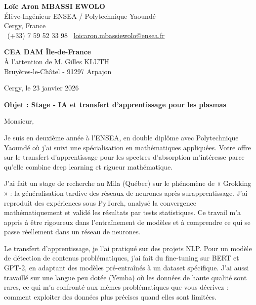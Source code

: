 \documentclass[a4paper,11pt]{article}
\begin{document}
\noindent
\textbf{Loïc Aron MBASSI EWOLO} \\
Élève-Ingénieur ENSEA / Polytechnique Yaoundé \\
Cergy, France \\
\faPhone\ (+33) 7 59 52 33 98 \quad \faEnvelope\ \href{mailto:loicaron.mbassiewolo@ensea.fr}{loicaron.mbassiewolo@ensea.fr}

\vspace{0.6cm}

\noindent
\textbf{CEA DAM Île-de-France} \\
À l'attention de M. Gilles KLUTH \\
Bruyères-le-Châtel - 91297 Arpajon

\hfill Cergy, le 23 janvier 2026

\vspace{0.5cm}

\noindent\textbf{Objet : Stage - IA et transfert d'apprentissage pour les plasmas}

\vspace{0.4cm}

Monsieur,

\vspace{0.3cm}

Je suis en deuxième année à l'ENSEA, en double diplôme avec Polytechnique Yaoundé où j'ai suivi une spécialisation en mathématiques appliquées. Votre offre sur le transfert d'apprentissage pour les spectres d'absorption m'intéresse parce qu'elle combine deep learning et rigueur mathématique.

\vspace{0.25cm}

J'ai fait un stage de recherche au Mila (Québec) sur le phénomène de « Grokking » : la généralisation tardive des réseaux de neurones après surapprentissage. J'ai reproduit des expériences sous PyTorch, analysé la convergence mathématiquement et validé les résultats par tests statistiques. Ce travail m'a appris à être rigoureux dans l'entraînement de modèles et à comprendre ce qui se passe réellement dans un réseau de neurones.

\vspace{0.25cm}

Le transfert d'apprentissage, je l'ai pratiqué sur des projets NLP. Pour un modèle de détection de contenus problématiques, j'ai fait du fine-tuning sur BERT et GPT-2, en adaptant des modèles pré-entraînés à un dataset spécifique. J'ai aussi travaillé sur une langue peu dotée (Yemba) où les données de haute qualité sont rares, ce qui m'a confronté aux mêmes problématiques que vous décrivez : comment exploiter des données plus précises quand elles sont limitées.
\end{document}
